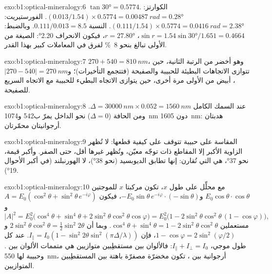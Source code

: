 \begin{solution}{exo:b1:optical-mineralogy:6}
$\tan\ang{30} = 0.5774$. الكوارتز: $(0.013/1.54)\times0.5774 = \qty{0.00487}{rad}
= \ang{0.28}$. الفورستيريت: $(0.111/1.54)\times0.5774 = \qty{0.0416}{rad} =
\ang{2.38}$. النسبة $0.111/0.013 = 8.5$. وبالضبط: $\sin r = 1.54\sin\ang{30}/1.651
= 0.4664$، $r = \ang{27.80}$، فيكون الانحراف \ang{2.20}: الصيغة من  الأولى تبالغ بنحو \qty{8}{\percent} لفرق في المعاملات كبير بهذا القدر.
\end{solution}

\begin{solution}{exo:b1:optical-mineralogy:7}
$270 + 540 = \qty{810}{nm}$، وهو أخضر من الرتبة الثانية، حين تتوازى الاتجاهات البطيئة للحبيبة والصفيحة (فتتجمع التأخيرات)؛ و$|270 - 540| =
\qty{270}{nm}$، أبيض من  الأولى مرة أخرى، حين يتوازى الاتجاه البطيء للحبيبة مع الاتجاه السريع للصفيحة.
\end{solution}

\begin{solution}{exo:b1:optical-mineralogy:8}
عند السمك الكامل $\Delta = \qty{30000}{nm}\times0.052 = \qty{1560}{nm}$. ومن الحافة ($\Delta = 0$) نحو الداخل يمرّ  ب\num{542} و\qty{1074}{nm} دون \qty{1605}{nm}: هدبتان أرجوانيتان محمّرتان.
\end{solution}

\begin{solution}{exo:b1:optical-mineralogy:9}
 المقاسة على حبيبة تتوقف على كيفية قطعها: لا تُظهر الزاوية الأكبر إلا المقاطع ذات توجّه معيّن، وتُظهر غيرها أقل، حتى الصفر. وأكبر قيمة، نحو \ang{37}، هي التي تُقارن: إنها تطابق الديوبسيد (نحو \ang{38})، لا الهورنبلند (في أكبر الأحوال \ang{19}).
\end{solution}

\begin{solution}{exo:b1:optical-mineralogy:10}
مع محلِّل على طول $x$، تكون مركبتا $x$ للموجتين
$E_0\cos\theta\cdot\cos\theta$ و$-E_0\sin\theta\,e^{-i\varphi}\cdot(-\sin\theta)$،
فيكون $A = E_0(\cos^2\theta + \sin^2\theta\,e^{-i\varphi})$ و
\[
  |A|^2 = E_0^2\bigl(\cos^4\theta + \sin^4\theta + 2\sin^2\theta\cos^2\theta\cos\varphi\bigr)
  = E_0^2\bigl(1 - 2\sin^2\theta\cos^2\theta\,(1 - \cos\varphi)\bigr),
\]
مستعملين $\cos^4\theta + \sin^4\theta = 1 - 2\sin^2\theta\cos^2\theta$. وبما أن
$2\sin^2\theta\cos^2\theta = \frac12\sin^2 2\theta$ و$1 - \cos\varphi =
2\sin^2(\varphi/2)$، فإن $I_\parallel = I_0(1 - \sin^2 2\theta\sin^2(\pi\Delta/\lambda))$.
عند كل طول موجي، $I_\parallel + I_\perp = I_0$: فالألوان بين مستقطِبين متوازيين هي متممات الألوان بين . وحبيبة لها \qty{550}{nm}، أرجوانية بين ، تكون مخضرّة مصفرّة باهتة بين المستقطِبين المتوازيين.
\end{solution}


